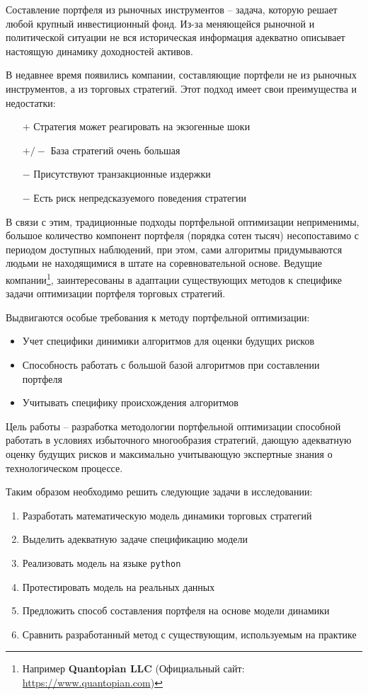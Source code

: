 Составление портфеля из рыночных инструментов -- задача, которую решает любой крупный инвестиционный фонд. Из-за меняющейся рыночной и политической ситуации не вся историческая информация адекватно описывает настоящую динамику доходностей активов. 


В недавнее время появились компании, составляющие портфели не из рыночных инструментов, а из торговых стратегий. Этот подход имеет свои преимущества и недостатки: 
\begin{itemize}
	\item[$+$] Стратегия может реагировать на экзогенные шоки
	\item[$+/-$] База стратегий очень большая
	\item[$-$] Присутствуют транзакционные издержки
	\item[$-$] Есть риск непредсказуемого поведения стратегии
\end{itemize}

В связи с этим, традиционные подходы портфельной оптимизации неприменимы, большое количество компонент портфеля (порядка сотен тысяч) несопоставимо с периодом доступных наблюдений, при этом, сами алгоритмы придумываются людьми не находящимися в штате на соревновательной основе. Ведущие компании\footnote{Например \textbf{Quantopian LLC} (Официальный сайт: \href{https://www.quantopian.com}{https://www.quantopian.com})},
заинтересованы в адаптации существующих методов к специфике задачи оптимизации портфеля торговых стратегий.

Выдвигаются особые требования к методу портфельной оптимизации:
\begin{itemize}
	\item Учет специфики динимики алгоритмов для оценки будущих рисков
	\item Способность работать с большой базой алгоритмов при составлении портфеля
	\item Учитывать специфику происхождения алгоритмов
\end{itemize}

Цель работы -- разработка методологии портфельной оптимизации способной работать в условиях избыточного многообразия стратегий, дающую адекватную оценку будущих рисков и максимально учитывающую экспертные знания о технологическом процессе. 

Таким образом необходимо решить следующие задачи в исследовании:
\begin{enumerate}
\item Разработать математическую модель динамики торговых стратегий
\item Выделить адекватную задаче спецификацию модели
\item Реализовать модель на языке \texttt{python}
\item Протестировать модель на реальных данных
\item Предложить способ составления портфеля на основе модели динамики
\item Сравнить разработанный метод с существующим, используемым на практике
\end{enumerate}

